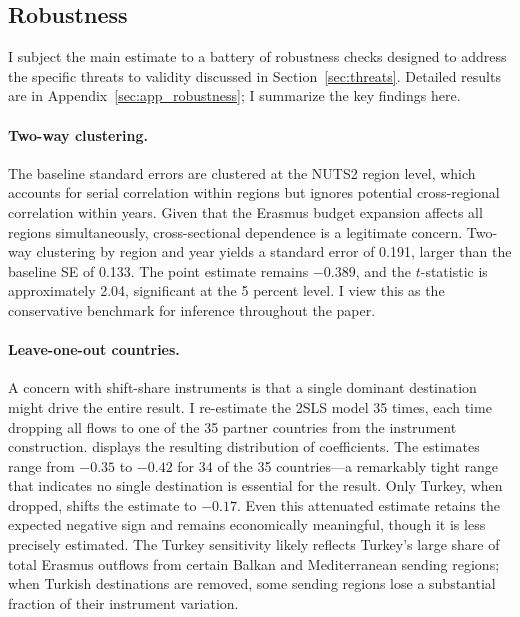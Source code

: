 \documentclass[12pt]{article}
\begin{document}
\subsection{Robustness}
\label{sec:robustness}

I subject the main estimate to a battery of robustness checks designed to address the specific threats to validity discussed in Section~\ref{sec:threats}. Detailed results are in Appendix~\ref{sec:app_robustness}; I summarize the key findings here.

\paragraph{Two-way clustering.} The baseline standard errors are clustered at the NUTS2 region level, which accounts for serial correlation within regions but ignores potential cross-regional correlation within years. Given that the Erasmus budget expansion affects all regions simultaneously, cross-sectional dependence is a legitimate concern. Two-way clustering by region and year yields a standard error of 0.191, larger than the baseline SE of 0.133. The point estimate remains $-0.389$, and the $t$-statistic is approximately 2.04, significant at the 5 percent level. I view this as the conservative benchmark for inference throughout the paper.

\paragraph{Leave-one-out countries.} A concern with shift-share instruments is that a single dominant destination might drive the entire result. I re-estimate the 2SLS model 35 times, each time dropping all flows to one of the 35 partner countries from the instrument construction.  displays the resulting distribution of coefficients. The estimates range from $-0.35$ to $-0.42$ for 34 of the 35 countries---a remarkably tight range that indicates no single destination is essential for the result. Only Turkey, when dropped, shifts the estimate to $-0.17$. Even this attenuated estimate retains the expected negative sign and remains economically meaningful, though it is less precisely estimated. The Turkey sensitivity likely reflects Turkey's large share of total Erasmus outflows from certain Balkan and Mediterranean sending regions; when Turkish destinations are removed, some sending regions lose a substantial fraction of their instrument variation.
\end{document}

